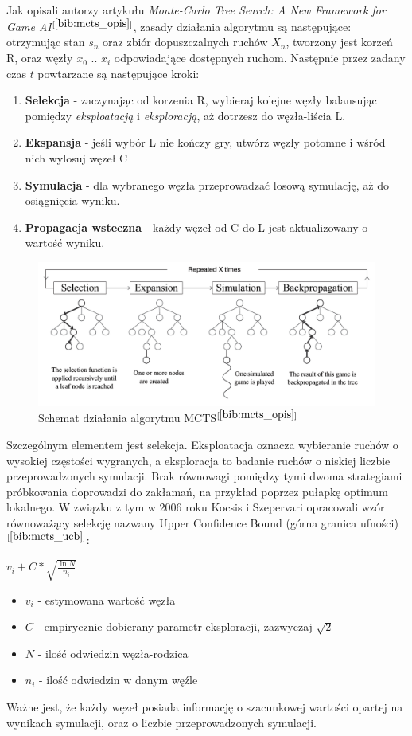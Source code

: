 Jak opisali autorzy artykułu \textit{Monte-Carlo Tree Search: A New Framework for Game AI}$^{[\ref{bib:mcts_opis}]}$, zasady działania algorytmu są następujące: otrzymując stan $s_n$ oraz zbiór dopuszczalnych ruchów $X_n$, tworzony jest korzeń R, oraz węzły $x_0$ .. $x_i$ odpowiadające dostępnych ruchom. Następnie przez zadany czas $t$ powtarzane są następujące kroki:
\begin{enumerate}
	\item \textbf{Selekcja} - zaczynając od korzenia R, wybieraj kolejne węzły balansując pomiędzy \textit{eksploatacją} i \textit{eksploracją}, aż dotrzesz do węzła-liścia L.
	\item \textbf{Ekspansja} - jeśli wybór L nie kończy gry, utwórz węzły potomne i wśród nich wylosuj węzeł C
	\item \textbf{Symulacja} - dla wybranego węzła przeprowadzać losową symulację, aż do osiągnięcia wyniku.
	\item \textbf{Propagacja wsteczna} - każdy węzeł od C do L jest aktualizowany o wartość wyniku.
\end{enumerate}
\begin{figure}[h]
	\centering
	\includegraphics[scale=0.5]{Resources/mcts.png}
	\caption{Schemat działania algorytmu MCTS$^{[\ref{bib:mcts_opis}]}$} 
	\label{fig:llMainImage}
\end{figure}
Szczególnym elementem jest selekcja. Eksploatacja oznacza wybieranie ruchów o wysokiej częstości wygranych, a eksploracja to badanie ruchów o niskiej liczbie przeprowadzonych symulacji. Brak równowagi pomiędzy tymi dwoma strategiami próbkowania doprowadzi do zakłamań, na przykład poprzez pułapkę optimum lokalnego. W związku z tym w 2006 roku Kocsis i Szepervari opracowali wzór równoważący selekcję nazwany Upper Confidence Bound (górna granica ufności)$^{[\ref{bib:mcts_ucb}]}$:
\begin{center}
	${v_i} + C*\sqrt{\frac{\ln{N}}{n_i}}$
\end{center}
\begin{itemize}
	\item $v_i$ - estymowana wartość węzła
	\item $C$ - empirycznie dobierany parametr eksploracji, zazwyczaj $\sqrt{2}$
	\item $N$ - ilość odwiedzin węzła-rodzica
	\item $n_i$ - ilość odwiedzin w danym węźle
\end{itemize}
Ważne jest, że każdy węzeł posiada informację o szacunkowej wartości opartej na wynikach symulacji, oraz o liczbie przeprowadzonych symulacji.

